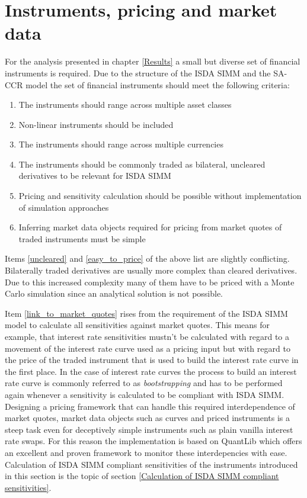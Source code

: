 \documentclass[../Thesis_AHoecherl.tex]{subfiles}
\begin{document}
    \section{Instruments, pricing and market data}\label{Instruments, pricing and market data}
    For the analysis presented in chapter \ref{Results} a small but diverse set of financial instruments is required. Due to the structure of the \gls{ISDA SIMM} and the \gls{SA-CCR} model the set of financial instruments should meet the following criteria:

    \begin{enumerate}
        \item The instruments should range across multiple asset classes
        \item Non-linear instruments should be included
        \item The instruments should range across multiple currencies
        \item The instruments should be commonly traded as bilateral, uncleared derivatives to be relevant for \gls{ISDA SIMM} \label{uncleared}
        \item Pricing and sensitivity calculation should be possible without implementation of simulation approaches \label{easy_to_price}
        \item Inferring market data objects required for pricing from market quotes of traded instruments must be simple \label{link_to_market_quotes}   
    \end{enumerate}
    
    Items \ref{uncleared} and \ref{easy_to_price} of the above list are slightly conflicting. Bilaterally traded derivatives are usually more complex than cleared derivatives. Due to this increased complexity many of them have to be priced with a Monte Carlo simulation since an analytical solution is not possible.

    Item \ref{link_to_market_quotes} rises from the requirement of the \gls{ISDA SIMM} model to calculate all sensitivities against market quotes. This means for example, that interest rate sensitivities mustn't be calculated with regard to a movement of the interest rate curve used as a pricing input but with regard to the price of the traded instrument that is used to build the interest rate curve in the first place. In the case of interest rate curves the process to build an interest rate curve is commonly referred to as \emph{bootstrapping} and has to be performed again whenever a sensitivity is calculated to be compliant with \gls{ISDA SIMM}. Designing a pricing framework that can handle this required interdependence of market quotes, market data objects such as curves and priced instruments is a steep task even for deceptively simple instruments such as plain vanilla interest rate swaps. For this reason the implementation is based on QuantLib which offers an excellent and proven framework to monitor these interdepencies with ease. Calculation of \gls{ISDA SIMM} compliant sensitivities of the instruments introduced in this section is the topic of section \ref{Calculation of ISDA SIMM compliant sensitivities}.
\end{document}
